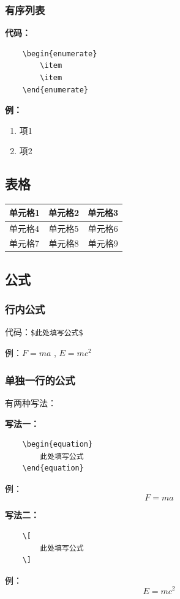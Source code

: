 \documentclass[UTF8]{ctexart}
\begin{document}
\subsubsection{有序列表} 
\textbf{代码：}
\begin{lstlisting}
    \begin{enumerate}
        \item
        \item
    \end{enumerate}
    \end{lstlisting}
\qquad \textbf{例：}
\begin{enumerate}
    \item 项1
    \item 项2
\end{enumerate}

\subsection{表格} 
\begin{tabular}{|p{3cm}|c|c|}
    \hline
    单元格1 & 单元格2 & 单元格3 \\
    \hline  \hline
    单元格4 & 单元格5 & 单元格6 \\
    \hline
    单元格7 & 单元格8 & 单元格9 \\
    \hline
\end{tabular}

\subsection{公式}
\subsubsection{行内公式}
代码：\verb|$此处填写公式$|

例：$F=ma$ , $E=mc^2$
\subsubsection{单独一行的公式}
有两种写法：

\textbf{写法一：}
\begin{lstlisting}
    \begin{equation}
        此处填写公式
    \end{equation}
\end{lstlisting}
\qquad 例：
\begin{equation}
    F=ma
\end{equation}

\textbf{写法二：}
\begin{lstlisting}
    \[
        此处填写公式
    \]
\end{lstlisting}
\qquad 例：
\[
    E=mc^2
\]
\end{document}
